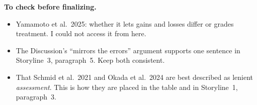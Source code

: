 \documentclass[11pt]{article}
\begin{document}
\textbf{To check before finalizing.}
\begin{itemize}[leftmargin=1.2em]
\item Yamamoto et al.\ 2025\cite{yamamoto2025}: whether it lets gains and losses differ or grades treatment. I could not access it from here.
\item The Discussion's ``mirrors the errors'' argument supports one sentence in Storyline~3, paragraph~5. Keep both consistent.
\item That Schmid et al.\ 2021\cite{schmid2021} and Okada et al.\ 2024\cite{okada2024} are best described as lenient \emph{assessment}. This is how they are placed in the table and in Storyline~1, paragraph~3.
\end{itemize}



\end{document}
